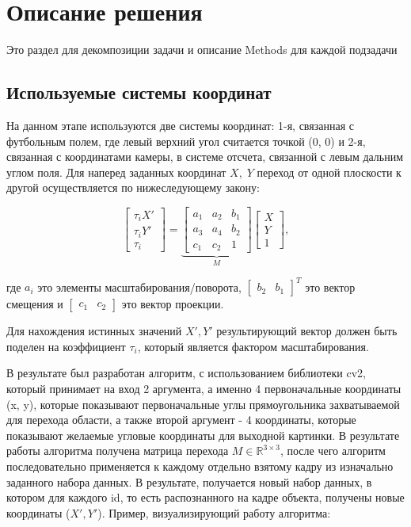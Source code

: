 \chapter{Описание решения}
 {\color{red} Это раздел для декомпозиции задачи и описание Methods для каждой подзадачи   }

 \section{Используемые системы координат   }\label{41}
На данном этапе используются две системы координат: 1-я, связанная с футбольным полем, где левый верхний угол считается точкой (0, 0) и 2-я, связанная с координатами камеры, в системе отсчета, связанной с левым дальним углом поля. Для наперед заданных координат  $X,\;Y$ переход от одной плоскости к другой осуществляется по нижеследующему закону:

$$
\begin{bmatrix}
\tau_{i}X' \\
\tau_{i}Y' \\
\tau_{i}
\end{bmatrix} = 
\underbrace{ \begin{bmatrix}
a_{1} & a_{2} & b_{1} \\
a_{3} & a_{4} & b_{2} \\
c_{1} & c_{2} & 1
\end{bmatrix} }_{ M } \begin{bmatrix}
X \\
Y \\
1
\end{bmatrix},
$$

где $a_i$ это элементы масштабирования/поворота, $\begin{bmatrix}
    b_2 & b_1
\end{bmatrix}^T$ это вектор смещения и $\begin{bmatrix}
    c_1 & c_2
\end{bmatrix}$ это вектор проекции.

Для нахождения истинных значений $X', Y'$ результирующий вектор должен быть поделен на коэффициент $\tau_i$, который является фактором масштабирования. 

В результате был разработан алгоритм, с использованием библиотеки cv2, который принимает на вход 2 аргумента, а именно 4 первоначальные координаты (x, y), которые показывают первоначальные углы прямоугольника захватываемой для перехода области, а также второй аргумент - 4 координаты, которые показывают желаемые угловые координаты для выходной картинки. В результате работы алгоритма получена матрица перехода $M \in \mathbb{R}^{3 \times 3}$, после чего алгоритм последовательно применяется к каждому отдельно взятому кадру из изначально заданного набора данных. В результате, получается новый набор данных, в котором для каждого id, то есть распознанного на кадре объекта, получены новые координаты ($X', Y'$). Пример, визуализирующий работу алгоритма:

